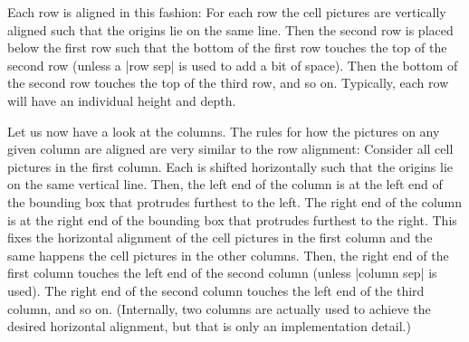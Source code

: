 Each row is aligned in this fashion: For each row the cell pictures
are vertically aligned such that the origins lie on the same
line. Then the second row is placed below the first row such that the
bottom of the first row touches the top of the second row (unless a
|row sep| is used to add a bit of space). Then the bottom of the
second row touches the top of the third row, and so on. Typically,
each row will have an individual height and depth.

\begin{codeexample}[]
\end{codeexample}

Let us now have a look at the columns. The rules for how the pictures
on any given column are aligned are very similar to the row
alignment: Consider all cell pictures in the first column. Each is
shifted horizontally such that the origins lie on the same vertical
line. Then, the left end of the column is at the left end of the
bounding box that protrudes furthest to the left. The right end of the
column is at the right end of the bounding box that protrudes furthest
to the right. This fixes the horizontal alignment of the cell pictures
in the first column and the same happens the cell pictures in the
other columns. Then, the right end of the first column touches the
left end of the second column (unless |column sep| is used). The right
end of the second column touches the left end of the third column, and
so on. (Internally, two columns are actually used to achieve the
desired horizontal alignment, but that is only an implementation
detail.)

\begin{codeexample}[]
\end{codeexample}

